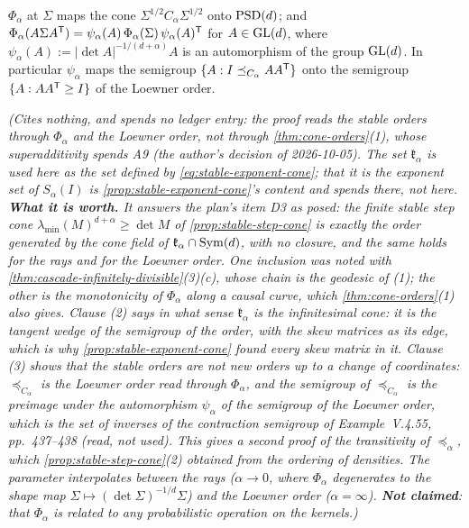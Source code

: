 \begin{proposition}
\begin{enumerate}
$\Phi_\alpha$ at $\Sigma$ maps the cone $\Sigma^{1/2}C_\alpha\Sigma^{1/2}$ onto $\mathrm{PSD}(d)$; and
$\Phi_\alpha(A\Sigma A^{\mathsf{T}}) = \psi_\alpha(A)\,\Phi_\alpha(\Sigma)\,\psi_\alpha(A)^{\mathsf{T}}$ for
$A \in \mathrm{GL}(d)$, where $\psi_\alpha(A) := |\det A|^{-1/(d+\alpha)}A$ is an automorphism of the group
$\mathrm{GL}(d)$. In particular $\psi_\alpha$ maps the semigroup $\{A : I \preceq_{C_\alpha} AA^{\mathsf{T}}\}$ onto the semigroup
$\{A : AA^{\mathsf{T}} \ge I\}$ of the Loewner order.
\end{enumerate}
\statusT\quad\emph{(Cites nothing, and spends no ledger entry: the proof reads the stable orders
through $\Phi_\alpha$ and the Loewner order, not through \ref{thm:cone-orders}(1), whose superadditivity
spends A9 (the author's decision of 2026-10-05). The set
$\mathfrak k_\alpha$ is used here as the set defined by \ref{eq:stable-exponent-cone}; that it is the exponent set of
$S_\alpha(I)$ is \ref{prop:stable-exponent-cone}'s content and spends  there, not here.
\textbf{What it is worth.} It answers the plan's item D3 as posed: the finite stable step cone
$\lambda_{\min}(M)^{d+\alpha} \ge \det M$ of \ref{prop:stable-step-cone} is exactly the order generated by the
cone field of $\mathfrak k_\alpha \cap \mathrm{Sym}(d)$, with no closure, and the same holds for the rays and for the Loewner
order. One inclusion was noted with \ref{thm:cascade-infinitely-divisible}(3)(c), whose chain is the
geodesic of (1); the other is the monotonicity of $\Phi_\alpha$ along a causal curve, which
\ref{thm:cone-orders}(1) also gives. Clause (2) says in what sense $\mathfrak k_\alpha$ is the
infinitesimal cone: it is the tangent wedge of the semigroup of the order, with the skew matrices as its
edge, which is why \ref{prop:stable-exponent-cone} found every skew matrix in it. Clause (3) shows that the
stable orders are not new orders up to a change of coordinates: $\preceq_{C_\alpha}$ is the Loewner order read
through $\Phi_\alpha$, and the semigroup of $\preceq_{C_\alpha}$ is the preimage under the automorphism
$\psi_\alpha$ of the semigroup of the Loewner order, which is the set of inverses of the contraction semigroup
of  Example~V.4.55, pp.~437--438 (read, not used). This gives a second proof of the transitivity of $\preceq_\alpha$, which
\ref{prop:stable-step-cone}(2) obtained from the ordering of \Levy{} densities. The parameter interpolates
between the rays ($\alpha \to 0$, where $\Phi_\alpha$ degenerates to the shape map $\Sigma \mapsto
(\det\Sigma)^{-1/d}\Sigma$) and the Loewner order ($\alpha = \infty$). \textbf{Not claimed}: that $\Phi_\alpha$
is related to any probabilistic operation on the kernels.)}
\end{proposition}

